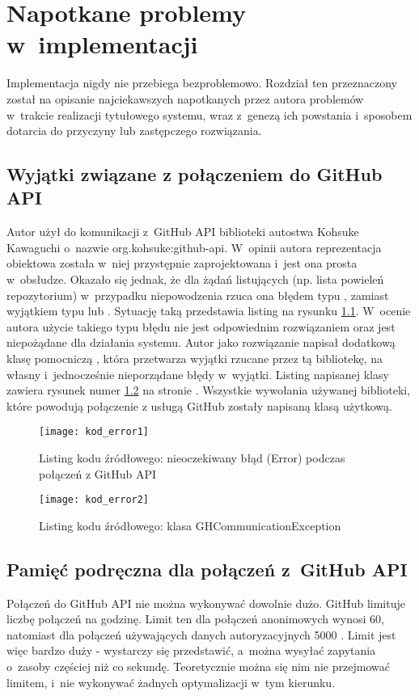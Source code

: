 \chapter{Napotkane problemy w~implementacji}
Implementacja nigdy nie przebiega bezproblemowo. Rozdział ten przeznaczony został na opisanie najciekawszych napotkanych przez autora problemów w~trakcie realizacji tytułowego systemu, wraz z~genezą ich powstania i~sposobem dotarcia do przyczyny lub zastępczego rozwiązania.

\section{Wyjątki związane z połączeniem do GitHub API}
Autor użył do komunikacji z~GitHub API biblioteki autostwa Kohsuke Kawaguchi o~nazwie org.kohsuke:github-api. W~opinii autora reprezentacja obiektowa została w~niej przystępnie zaprojektowana i~jest ona prosta w~obsłudze. Okazało się jednak, że dla żądań listujących (np. lista powieleń repozytorium) w~przypadku niepowodzenia rzuca ona błędem typu , zamiast wyjątkiem typu  lub . Sytuację taką przedstawia listing na rysunku \ref{koderr1}. W~ocenie autora użycie takiego typu błędu nie jest odpowiednim rozwiązaniem oraz jest niepożądane dla działania systemu. Autor jako rozwiązanie napisał dodatkową klasę pomocniczą , która przetwarza wyjątki rzucane przez tą bibliotekę, na własny  i~jednocześnie  nieporządane błędy w~wyjątki. Listing napisanej klasy zawiera rysunek numer \ref{koderr2} na stronie \pageref{koderr2}. Wszystkie wywołania używanej biblioteki, które powodują połączenie z usługą GitHub zostały  napisaną klasą użytkową.

\begin{figure}[!h]
\centering
    \texttt{[image: kod\_error1]}
    \caption{Listing kodu źródłowego: nieoczekiwany błąd (Error) podczas połączeń z GitHub API}
    \label{koderr1}
\end{figure}


\begin{figure}[!h]
\centering
    \texttt{[image: kod\_error2]}
    \caption{Listing kodu źródłowego: klasa GHCommunicationException}
    \label{koderr2}
\end{figure}

\section{Pamięć podręczna dla połączeń z~GitHub API}
Połączeń do GitHub API nie można wykonywać dowolnie dużo. GitHub limituje liczbę połączeń na godzinę. Limit ten dla połączeń anonimowych wynosi 60, natomiast dla połączeń używających danych autoryzacyjnych 5000 \cite{GitHubApiDoc}. Limit jest więc bardzo duży - wystarczy się przedstawić, a~można wysyłać zapytania o~zasoby częściej niż co sekundę. Teoretycznie można się nim nie przejmować limitem, i~nie wykonywać żadnych optymalizacji w~tym kierunku.

